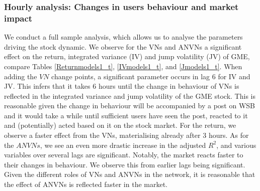 \subsubsection{Hourly analysis: Changes in users behaviour and market impact}
%


We conduct a full sample analysis, which allows us to analyse the parameters driving the stock dynamic. 
We observe for the VNs and ANVNs a significant effect on the return, integrated variance (IV) and jump volatility (JV) of GME, compare Tables \ref{Returnmodels1_t}, \ref{IVmodels1_t}, and \ref{Jmodels1_t}.  When adding the $VN$ change points, a significant parameter occurs in lag $6$ for IV and JV. This infers that it takes 6 hours until the change in behaviour of VNs is reflected in the integrated variance and jump volatility of the GME stock. This is reasonable given the change in behaviour will be accompanied by a post on WSB and it would take a while until sufficient users have seen the post, reacted to it and (potentially) acted based on it on the stock market. For the return, we observe a faster effect from the VNs, materialising already after 3 hours. As for the $ANVNs$, we see an even more drastic increase in the adjusted $R^2$, and various variables over several lags are significant. Notably, the market reacts faster to their changes in behaviour. We observe this from earlier lags being significant. Given the different roles of VNs and ANVNs in the network, it is reasonable that the effect of ANVNs is reflected faster in the market. %
